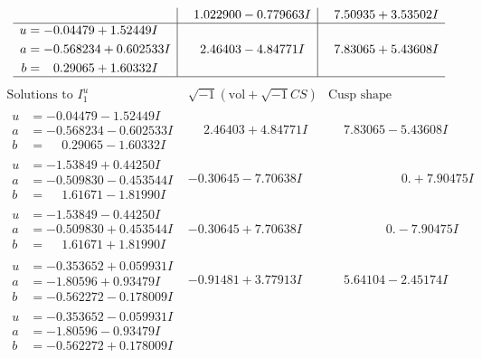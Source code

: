 \documentclass[1p]{elsarticle_modified}
\theoremstyle{definition}
\newcommand{\I}{\sqrt{-1}}
\begin{document}
$$\begin{array}{c|c|c}
 & \phantom{-}1.022900 - 0.779663 I & \phantom{-}7.50935 + 3.53502 I \\ \hline\begin{aligned}
u &= -0.04479 + 1.52449 I \\
a &= -0.568234 + 0.602533 I \\
b &= \phantom{-}0.29065 + 1.60332 I\end{aligned}
 & \phantom{-}2.46403 - 4.84771 I & \phantom{-}7.83065 + 5.43608 I\\
 \hline 
 \end{array}$$\newpage$$\begin{array}{c|c|c}  
\text{Solutions to }I^u_{1}& \I (\text{vol} + \sqrt{-1}CS) & \text{Cusp shape}\\
 \hline 
\begin{aligned}
u &= -0.04479 - 1.52449 I \\
a &= -0.568234 - 0.602533 I \\
b &= \phantom{-}0.29065 - 1.60332 I\end{aligned}
 & \phantom{-}2.46403 + 4.84771 I & \phantom{-}7.83065 - 5.43608 I \\ \hline\begin{aligned}
u &= -1.53849 + 0.44250 I \\
a &= -0.509830 - 0.453544 I \\
b &= \phantom{-}1.61671 - 1.81990 I\end{aligned}
 & -0.30645 - 7.70638 I & \phantom{-0.000000 -}0. + 7.90475 I \\ \hline\begin{aligned}
u &= -1.53849 - 0.44250 I \\
a &= -0.509830 + 0.453544 I \\
b &= \phantom{-}1.61671 + 1.81990 I\end{aligned}
 & -0.30645 + 7.70638 I & \phantom{-0.000000 } 0. - 7.90475 I \\ \hline\begin{aligned}
u &= -0.353652 + 0.059931 I \\
a &= -1.80596 + 0.93479 I \\
b &= -0.562272 - 0.178009 I\end{aligned}
 & -0.91481 + 3.77913 I & \phantom{-}5.64104 - 2.45174 I \\ \hline\begin{aligned}
u &= -0.353652 - 0.059931 I \\
a &= -1.80596 - 0.93479 I \\
b &= -0.562272 + 0.178009 I\end{aligned}

\end{array}$$
\end{document}
